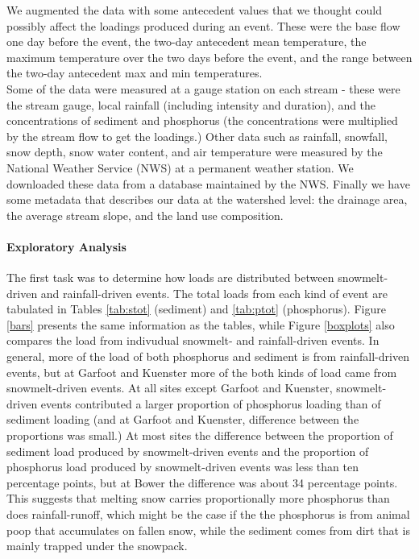 \documentclass[10pt]{article}
\begin{document}
We augmented the data with some antecedent values that we thought could possibly affect the loadings produced during an event. These were the base flow one day before the event, the two-day antecedent mean temperature, the maximum temperature over the two days before the event, and the range between the two-day antecedent max and min temperatures.\\

Some of the data were measured at a gauge station on each stream - these were the stream gauge, local rainfall (including intensity and duration), and the concentrations of sediment and phosphorus (the concentrations were multiplied by the stream flow to get the loadings.) Other data such as rainfall, snowfall, snow depth, snow water content, and air temperature were measured by the National Weather Service (NWS) at a permanent weather station. We downloaded these data from a database maintained by the NWS. Finally we have some metadata that describes our data at the watershed level: the drainage area, the average stream slope, and the land use composition.\\


\paragraph{Exploratory Analysis}
The first task was to determine how loads are distributed between snowmelt-driven and rainfall-driven events. The total loads from each kind of event are tabulated in Tables \ref{tab:stot} (sediment) and \ref{tab:ptot} (phosphorus). Figure \ref{bars} presents the same information as the tables, while Figure \ref{boxplots} also compares the load from indivudual snowmelt- and rainfall-driven events. In general, more of the load of both phosphorus and sediment is from rainfall-driven events, but at Garfoot and Kuenster more of the both kinds of load came from snowmelt-driven events. At all sites except Garfoot and Kuenster, snowmelt-driven events contributed a larger proportion of phosphorus loading than of sediment loading (and at Garfoot and Kuenster, difference between the proportions was small.) At most sites the difference between the proportion of sediment load produced by snowmelt-driven events and the proportion of phosphorus load produced by snowmelt-driven events was less than ten percentage points, but at Bower the difference was about 34 percentage points. This suggests that melting snow carries proportionally more phosphorus than does rainfall-runoff, which might be the case if the the phosphorus is from animal poop that accumulates on fallen snow, while the sediment comes from dirt that is mainly trapped under the snowpack.\\
\end{document}
